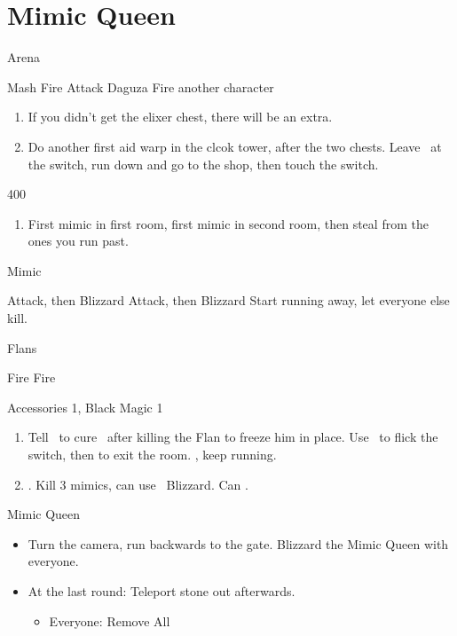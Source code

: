 \chapter{Mimic Queen}


\begin{battle}{Arena}
\begin{itemize}
\vaanf Mash Fire
\balthierf Attack Daguza
\vaanf Fire another character
\end{itemize}
\end{battle}
\begin{enumerate}
\item If you didn't get the elixer chest, there will be an extra.
\item Do another first aid warp in the clcok tower, after the two chests. Leave \balthier\ at the switch, run down and go to the shop, then touch the switch.
\end{enumerate}
\begin{shop}{400}
\end{shop}
\begin{enumerate}
\item First mimic in first room, first mimic in second room, then steal from the ones you run past.
\end{enumerate}
\begin{battle}{Mimic}
\begin{itemize}
\franf Attack, then Blizzard
\vaanf Attack, then Blizzard
\franf Start running away, let everyone else kill.
\end{itemize}
\end{battle}
\begin{battle}{Flans}
\begin{itemize}
\franf Fire
\vaanf Fire
\end{itemize}
\end{battle}
\begin{liscense}
\begin{itemize}
\balthierf Accessories 1, Black Magic 1
\end{itemize}
\end{liscense}
\begin{enumerate}
\item Tell \balthier\ to cure \vaan\ after killing the Flan to freeze him in place. Use \vaan\ to flick the switch, then \leader{\balthier} to exit the room. \leader{\fran}, keep running.
\item {}. Kill 3 mimics, can use \balthier\ Blizzard. Can . \save
\end{enumerate}
\begin{battle}{Mimic Queen}
\begin{itemize}
\item Turn the camera, run backwards to the gate. Blizzard the Mimic Queen with everyone.
\item At the last round: Teleport stone out afterwards.
\begin{equip}
\begin{itemize}
\item Everyone: Remove All
\end{itemize}
\end{equip}
\end{itemize}
\end{battle}